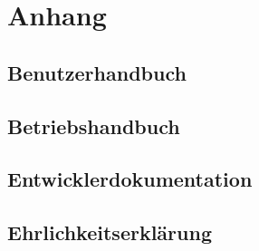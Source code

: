 
\renewcommand\refname{Literaturverzeichnis}



\cleardoublepage
\listoffigures

\section{Anhang}
    \subsection{Benutzerhandbuch}
    \subsection{Betriebshandbuch}
    \subsection{Entwicklerdokumentation}
    \subsection{Ehrlichkeitserklärung}